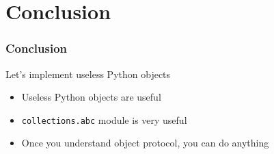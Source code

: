 \documentclass[aspectratio=169,dvipdfmx,12pt,notheorems]{beamer}
\theoremstyle{definition}
\begin{document}
\section{Conclusion}

\begin{frame}\frametitle{Conclusion}

\begin{block}{Let's implement useless Python objects}
\begin{itemize}
\item Useless Python objects are useful
\item \texttt{collections.abc} module is very useful
\item Once you understand object protocol, you can do anything
\end{itemize}
\end{block}
\end{frame}
\end{document}
